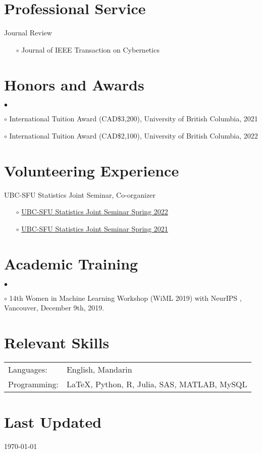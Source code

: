 \documentclass[margin,line]{res}
\newenvironment{list2}{
  \begin{list}{$\bullet$}{%
      \setlength{\itemsep}{0in}
      \setlength{\parsep}{0in} \setlength{\parskip}{0in}
      \setlength{\topsep}{0in} \setlength{\partopsep}{0in}
      \setlength{\leftmargin}{0.2in}}}{\end{list}}
\begin{document}
\begin{resume}
\section{\sc Professional Service}
{Journal Review}
\begin{itemize}
\item[$\circ$] Journal of IEEE Transaction on Cybernetics
\end{itemize}

\section{\sc Honors and Awards}

\begin{list2}

\item[$\circ$] {International Tuition Award (CAD\$3,200), University of British Columbia, 2021}
\item[$\circ$] {International Tuition Award (CAD\$2,100), University of British Columbia, 2022}
\end{list2}

\section{\sc Volunteering Experience}
{UBC-SFU Statistics Joint Seminar, Co-organizer }
\begin{itemize}
\item[$\circ$] \href{https://ubc-sfu-joint-stat-seminar-spring-2022.github.io}{UBC-SFU Statistics Joint Seminar Spring 2022}
\item[$\circ$]\href{https://www.stat.ubc.ca/~kenny.chiu/jointseminar/spring2021/}{UBC-SFU Statistics Joint Seminar Spring 2021}

\end{itemize}
\section{\sc Academic  Training}
\begin{list2}
\item[$\circ$]{14th Women in Machine Learning Workshop (WiML 2019) with  NeurIPS} \hfill{,  Vancouver, December 9th, 2019.}
\end{list2}
\section{\sc Relevant Skills}

\vspace{.05in}
\begin{tabular}{@{}p{0.8in}p{4.25in}}

Languages:& English, Mandarin \\
Programming:& \LaTeX, Python, R, Julia, SAS, MATLAB, MySQL\\

\end{tabular}
\section{\sc Last Updated}
\today


\end{resume}
\end{document}
